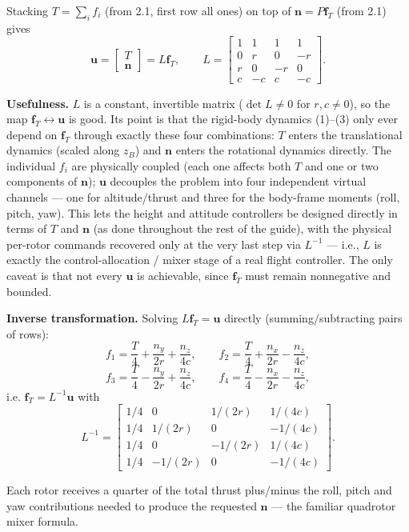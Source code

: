 \documentclass[11pt]{article}
\begin{document}
Stacking $T = \sum_i f_i$ (from 2.1, first row all ones) on top of $\mathbf{n} = P\mathbf{f}_T$ (from 2.1) gives
\[
\mathbf{u} = \begin{bmatrix} T \\ \mathbf{n} \end{bmatrix} = L\mathbf{f}_T, \qquad L = \begin{bmatrix} 1 & 1 & 1 & 1 \\ 0 & r & 0 & -r \\ r & 0 & -r & 0 \\ c & -c & c & -c \end{bmatrix}.
\]

\noindent\textbf{Usefulness.} $L$ is a constant, invertible matrix ($\det L \neq 0$ for $r, c \neq 0$), so the map $\mathbf{f}_T \leftrightarrow \mathbf{u}$ is good. Its point is that the rigid-body dynamics (1)--(3) only ever depend on $\mathbf{f}_T$ through exactly these four combinations: $T$ enters the translational dynamics (scaled along $z_B$) and $\mathbf{n}$ enters the rotational dynamics directly. The individual $f_i$ are physically coupled (each one affects both $T$ and one or two components of $\mathbf{n}$); $\mathbf{u}$ decouples the problem into four independent virtual channels --- one for altitude/thrust and three for the body-frame moments (roll, pitch, yaw). This lets the height and attitude controllers be designed directly in terms of $T$ and $\mathbf{n}$ (as done throughout the rest of the guide), with the physical per-rotor commands recovered only at the very last step via $L^{-1}$ --- i.e., $L$ is exactly the control-allocation / mixer stage of a real flight controller. The only caveat is that not every $\mathbf{u}$ is achievable, since $\mathbf{f}_T$ must remain nonnegative and bounded.

\noindent\textbf{Inverse transformation.} Solving $L\mathbf{f}_T = \mathbf{u}$ directly (summing/subtracting pairs of rows):
\[
f_1 = \frac{T}{4} + \frac{n_y}{2r} + \frac{n_z}{4c}, \qquad f_2 = \frac{T}{4} + \frac{n_x}{2r} - \frac{n_z}{4c},
\]
\[
f_3 = \frac{T}{4} - \frac{n_y}{2r} + \frac{n_z}{4c}, \qquad f_4 = \frac{T}{4} - \frac{n_x}{2r} - \frac{n_z}{4c},
\]
i.e. $\mathbf{f}_T = L^{-1}\mathbf{u}$ with
\[
L^{-1} = \begin{bmatrix} 1/4 & 0 & 1/(2r) & 1/(4c) \\ 1/4 & 1/(2r) & 0 & -1/(4c) \\ 1/4 & 0 & -1/(2r) & 1/(4c) \\ 1/4 & -1/(2r) & 0 & -1/(4c) \end{bmatrix}.
\]

Each rotor receives a quarter of the total thrust plus/minus the roll, pitch and yaw contributions needed to produce the requested $\mathbf{n}$ --- the familiar quadrotor mixer formula.
\end{document}
